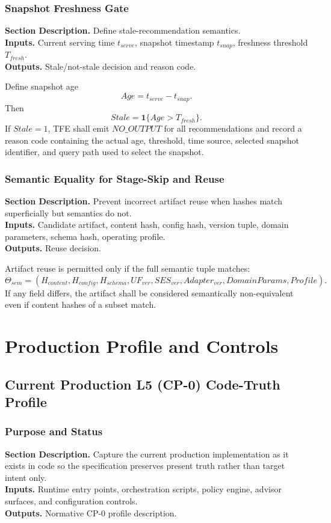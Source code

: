 \documentclass[11pt]{report}
\newcommand{\meta}[3]{\textbf{Section Description.} #1\\
\textbf{Inputs.} #2\\
\textbf{Outputs.} #3\par}
\begin{document}
\section{Snapshot Freshness Gate}
\meta{Define stale-recommendation semantics.}{Current serving time $t_{serve}$, snapshot timestamp $t_{snap}$, freshness threshold $T_{fresh}$.}{Stale/not-stale decision and reason code.}

Define snapshot age
\[
Age = t_{serve}-t_{snap}.
\]
Then
\[
Stale = \mathbf{1}\{Age > T_{fresh}\}.
\]
If $Stale=1$, TFE shall emit $NO\_OUTPUT$ for all recommendations and record a reason code containing the actual age, threshold, time source, selected snapshot identifier, and query path used to select the snapshot.

\section{Semantic Equality for Stage-Skip and Reuse}
\meta{Prevent incorrect artifact reuse when hashes match superficially but semantics do not.}{Candidate artifact, content hash, config hash, version tuple, domain parameters, schema hash, operating profile.}{Reuse decision.}

Artifact reuse is permitted only if the full semantic tuple matches:
\[
\Theta_{sem}=(H_{content},H_{config},H_{schema},UF_{ver},SES_{ver},Adapter_{ver},DomainParams,Profile).
\]
If any field differs, the artifact shall be considered semantically non-equivalent even if content hashes of a subset match.

\part{Production Profile and Controls}

\chapter{Current Production L5 (CP-0) Code-Truth Profile}
\section{Purpose and Status}
\meta{Capture the current production implementation as it exists in code so the specification preserves present truth rather than target intent only.}{Runtime entry points, orchestration scripts, policy engine, advisor surfaces, and configuration controls.}{Normative CP-0 profile description.}
\end{document}
